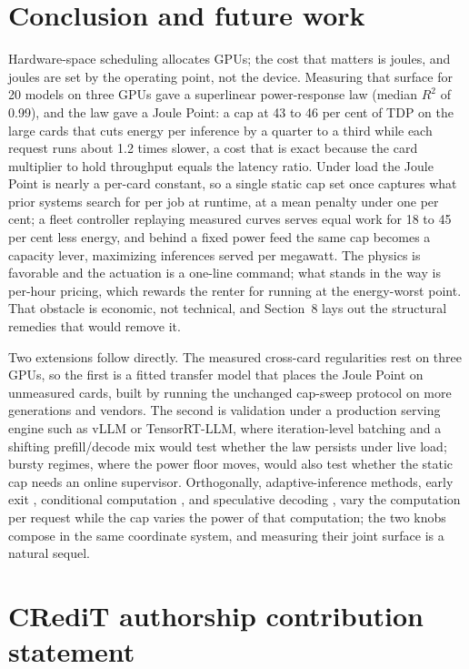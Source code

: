\section{Conclusion and future work}\label{conclusion-and-future-work}

Hardware-space scheduling allocates GPUs; the cost that matters is joules, and joules are set by the operating point, not the device. Measuring that surface for 20 models on three GPUs gave a superlinear power-response law (median {\(R^2\)} of 0.99), and the law gave a Joule Point: a cap at 43 to 46 per cent of TDP on the large cards that cuts energy per inference by a quarter to a third while each request runs about 1.2 times slower, a cost that is exact because the card multiplier to hold throughput equals the latency ratio. Under load the Joule Point is nearly a per-card constant, so a single static cap set once captures what prior systems search for per job at runtime, at a mean penalty under one per cent; a fleet controller replaying measured curves serves equal work for 18 to 45 per cent less energy, and behind a fixed power feed the same cap becomes a capacity lever, maximizing inferences served per megawatt. The physics is favorable and the actuation is a one-line command; what stands in the way is per-hour pricing, which rewards the renter for running at the energy-worst point. That obstacle is economic, not technical, and Section~8 lays out the structural remedies that would remove it.

Two extensions follow directly. The measured cross-card regularities rest on three GPUs, so the first is a fitted transfer model that places the Joule Point on unmeasured cards, built by running the unchanged cap-sweep protocol on more generations and vendors. The second is validation under a production serving engine such as vLLM or TensorRT-LLM, where iteration-level batching and a shifting prefill/decode mix would test whether the law persists under live load; bursty regimes, where the power floor moves, would also test whether the static cap needs an online supervisor. Orthogonally, adaptive-inference methods, early exit \cite{ref5, ref11}, conditional computation \cite{ref6, ref7}, and speculative decoding \cite{ref8}, vary the computation per request while the cap varies the power of that computation; the two knobs compose in the same coordinate system, and measuring their joint surface is a natural sequel.

\section{CRediT authorship contribution statement}\label{credit-authorship-contribution-statement}

